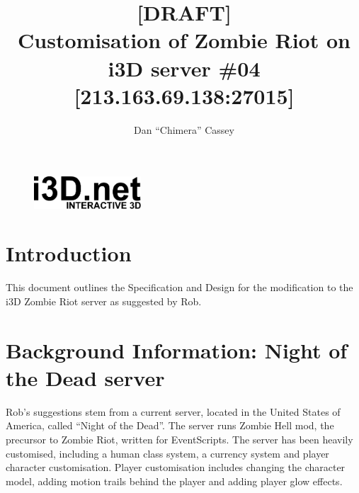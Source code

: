 \documentclass[a4paper, 11pt]{article}
\begin{document}
\title{[DRAFT]\\Customisation of Zombie Riot on\\i3D server \#04 [213.163.69.138:27015]}
\author{Dan ``Chimera'' Cassey}
\begin{figure}
\vspace{-20pt}
\includegraphics[width=4cm]{i3D_logo.pdf}
\vspace{-60pt}
\end{figure}
\maketitle
\section{Introduction}
This document outlines the Specification and Design for the modification to the i3D Zombie Riot server as suggested by Rob.
\section{Background Information: Night of the Dead server}
Rob's suggestions stem from a current server, located in the United States of America, called ``Night of the Dead''. The server runs Zombie Hell mod, the precursor to Zombie Riot, written for EventScripts. The server has been heavily customised, including a human class system, a currency system and player character customisation. Player customisation includes changing the character model, adding motion trails behind the player and adding player glow effects.
\end{document}
